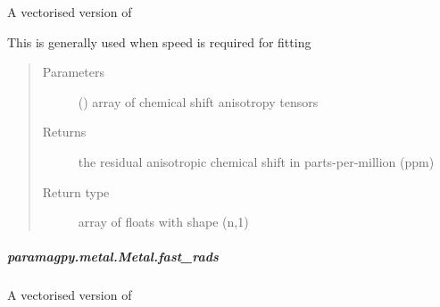 \documentclass[a4paper,10pt,english,openany,oneside]{sphinxmanual}
\begin{document}
\begin{fulllineitems}
\begin{fulllineitems}
\begin{fulllineitems}
\label{\detokenize{reference/generated/paramagpy.metal.Metal.fast_racs:paramagpy.metal.Metal.fast_racs}}
A vectorised version of {\hyperref[\detokenize{reference/generated/paramagpy.metal.Metal.racs:paramagpy.metal.Metal.racs}]{}}

This is generally used when speed is required for fitting
\begin{quote}\begin{description}
\item[{Parameters}] \leavevmode
{} (\sphinxstyleliteralemphasis{\sphinxupquote{ (}}\sphinxstyleliteralemphasis{\sphinxupquote{,}}\sphinxstyleliteralemphasis{\sphinxupquote{,}}\sphinxstyleliteralemphasis{\sphinxupquote{)}}) \textendash{} array of chemical shift anisotropy tensors

\item[{Returns}] \leavevmode
{} \textendash{} the residual anisotropic chemical shift in parts-per-million (ppm)

\item[{Return type}] \leavevmode
array of floats with shape (n,1)

\end{description}\end{quote}

\end{fulllineitems}



\subparagraph{paramagpy.metal.Metal.fast\_rads}
\label{\detokenize{reference/generated/paramagpy.metal.Metal.fast_rads:paramagpy-metal-metal-fast-rads}}\label{\detokenize{reference/generated/paramagpy.metal.Metal.fast_rads::doc}}

\begin{fulllineitems}
\label{\detokenize{reference/generated/paramagpy.metal.Metal.fast_rads:paramagpy.metal.Metal.fast_rads}}
A vectorised version of {\hyperref[\detokenize{reference/generated/paramagpy.metal.Metal.rads:paramagpy.metal.Metal.rads}]{}}


\end{fulllineitems}
\end{fulllineitems}
\end{fulllineitems}
\end{document}

